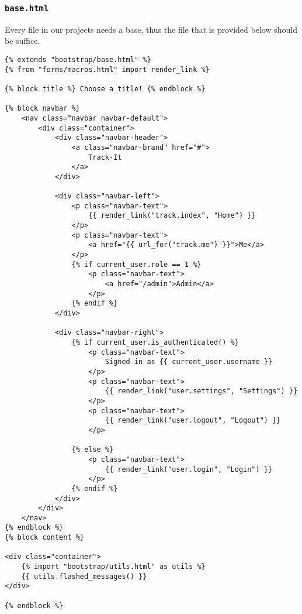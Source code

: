 \documentclass[../main/main.tex]{subfiles}
\begin{document}
\subsubsection{\lstinline|base.html|}

Every file in our projects needs a base, thus the file that is provided below
should be suffice. 

\begin{lstlisting}
{% extends "bootstrap/base.html" %}
{% from "forms/macros.html" import render_link %}

{% block title %} Choose a title! {% endblock %}

{% block navbar %}
    <nav class="navbar navbar-default">
        <div class="container">
            <div class="navbar-header">
                <a class="navbar-brand" href="#">
                    Track-It
                </a>
            </div>

            <div class="navbar-left">
                <p class="navbar-text">
                    {{ render_link("track.index", "Home") }}
                </p>
                <p class="navbar-text">
                    <a href="{{ url_for("track.me") }}">Me</a>
                </p>
                {% if current_user.role == 1 %}
                    <p class="navbar-text">
                        <a href="/admin">Admin</a>
                    </p>
                {% endif %}
            </div>

            <div class="navbar-right">
                {% if current_user.is_authenticated() %}
                    <p class="navbar-text">
                        Signed in as {{ current_user.username }}
                    </p>
                    <p class="navbar-text">
                        {{ render_link("user.settings", "Settings") }}
                    </p>
                    <p class="navbar-text">
                        {{ render_link("user.logout", "Logout") }}
                    </p>

                {% else %}
                    <p class="navbar-text">
                        {{ render_link("user.login", "Login") }}
                    </p>
                {% endif %}
            </div>
        </div>
    </nav>
{% endblock %}
{% block content %}

<div class="container">
    {% import "bootstrap/utils.html" as utils %}
    {{ utils.flashed_messages() }}
</div>

{% endblock %}
\end{lstlisting}


% 
\end{document}
